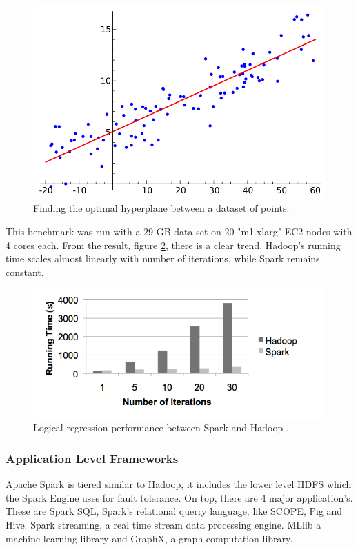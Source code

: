 \documentclass[10pt,twocolumn]{IEEEtran11}
\begin{document}
\begin{figure}[h]
	\centering
	\includegraphics[scale=0.3]{images/logicalRegression.png}
	\caption{Finding the optimal hyperplane between a dataset of points.}
	\label{fig:logicalRegression}
\end{figure}

This benchmark was run with a 29 GB data set on 20 "m1.xlarg" EC2 nodes with 4 cores each.  From the result, figure \ref{fig:sparkPerformance},  there is a clear trend, Hadoop's running time scales almost linearly with number of iterations, while Spark remains constant.

\begin{figure}[h]
	\centering
	\includegraphics[width = 10 cm]{images/sparkPerformance.png}
	\caption{Logical regression performance between Spark and Hadoop  \protect\cite{zaharia2010spark}.}
	\label{fig:sparkPerformance}
\end{figure}

\subsubsection{Application Level Frameworks}
Apache Spark is tiered similar to Hadoop, it includes the lower level HDFS which the Spark Engine uses for fault tolerance.  On top, there are 4 major application's.  These are Spark SQL, Spark's relational querry language, like SCOPE, Pig and Hive.  Spark streaming, a real time stream data processing engine.  MLlib a machine learning library and GraphX, a graph computation library.
\end{document}
